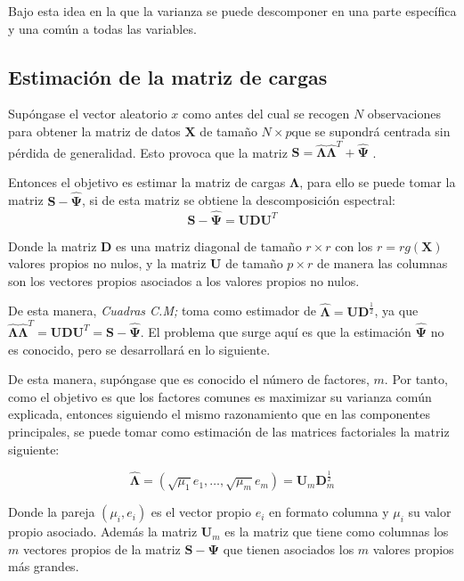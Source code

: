 \noindent Bajo esta idea en la que la varianza se puede descomponer en una parte específica y una común a todas las variables. 

\subsection{Estimación de la matriz de cargas}
\noindent Supóngase el vector aleatorio $x$ como antes del cual se recogen $N$ observaciones para obtener la matriz de datos $\mathbf{X}$ de tamaño $N\times p $que se supondrá centrada sin pérdida de generalidad. Esto provoca que la matriz $\mathbf{S}=\mathbf{\hat{\Lambda}}\mathbf{\hat{\Lambda}}^T+\mathbf{\hat{\Psi}}$ \cite{Peña 2002}. 

\noindent Entonces el objetivo es estimar la matriz de cargas $\mathbf{\Lambda}$, para ello se puede tomar la matriz $\mathbf{S}-\mathbf{\hat{\Psi}}$, si de esta matriz se obtiene la descomposición espectral:
\begin{equation}
\mathbf{S}-\mathbf{\hat{\Psi}}=\mathbf{U}\mathbf{D}\mathbf{U}^T
\end{equation}

\noindent Donde la matriz $\mathbf{D}$ es una matriz diagonal de tamaño $r\times r$ con los $r=rg(\mathbf{X})$ valores propios no nulos, y la matriz $\mathbf{U}$ de tamaño $p\times r$ de manera las columnas son los vectores propios asociados a los valores propios no nulos. 

\noindent De esta manera, \emph{Cuadras C.M;} \cite{Cuadras 2014} toma como estimador de $\mathbf{\hat{\Lambda}}=\mathbf{UD}^{\frac{1}{2}}$, ya que $\mathbf{\hat{\Lambda}}\mathbf{\hat{\Lambda}}^T=\mathbf{U}\mathbf{D}\mathbf{U}^T= \mathbf{S-\hat{\Psi}}$. El problema que surge aquí es que la estimación $\mathbf{\hat{\Psi}}$ no es conocido, pero se desarrollará en lo siguiente. 

\noindent De esta manera, supóngase que es conocido el número de factores, $m$. Por tanto, como el objetivo es que los factores comunes es maximizar su varianza común explicada, entonces siguiendo el mismo razonamiento que en las componentes principales, se puede tomar como estimación de las matrices factoriales la matriz siguiente:

\begin{equation}
\mathbf{\hat{\Lambda}}=(\sqrt{\mu_1}e_1,\ldots,\sqrt{\mu_m}e_m)=\mathbf{U}_m\mathbf{D}_m^{\frac{1}{2}}
\end{equation}

\noindent Donde la pareja $(\mu_i, e_i)$ es el vector propio $e_i$ en formato columna y $\mu_i$ su valor propio asociado. Además la matriz $\mathbf{U}_m$ es la matriz que tiene como columnas los $m$ vectores propios de la matriz $\mathbf{S}-\mathbf{\Psi}$ que tienen asociados los $m$ valores propios más grandes. 

